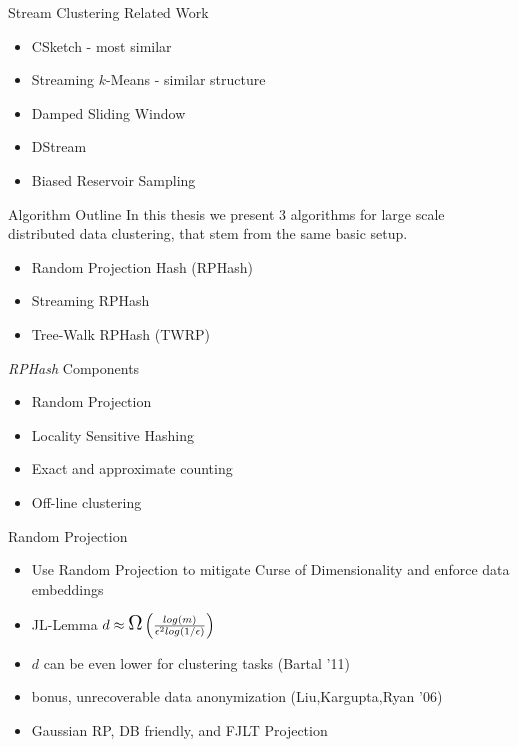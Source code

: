 \documentclass[12pt]{beamer}
\begin{document}
\begin{frame}[plain]{Stream Clustering Related Work}
    \begin{itemize}
      \item CSketch - most similar
      \item Streaming $k$-Means - similar structure
      \item Damped Sliding Window
      \item DStream
      \item Biased Reservoir Sampling
    \end{itemize}
\end{frame}

\begin{frame}[plain]{Algorithm Outline}
In this thesis we present 3 algorithms for large scale distributed data clustering, that
stem from the same basic setup.
 \begin{itemize}
  \item Random Projection Hash (RPHash)
  \item Streaming RPHash
  \item Tree-Walk RPHash (TWRP)
 \end{itemize}
\end{frame}

\begin{frame}[plain]{\emph{RPHash} Components}
\begin{itemize}
   \item Random Projection 
   \item Locality Sensitive Hashing
   \item Exact and approximate counting
   \item Off-line clustering
  \end{itemize}
\end{frame}

\begin{frame}[plain]{Random Projection}
\begin{itemize}
 \item Use Random Projection to mitigate Curse of Dimensionality and enforce data embeddings

\item JL-Lemma
$d \approx \mathlarger{\mathlarger{\mathlarger{\Omega}}} \left( \frac{log(m)}{\epsilon^2 log(1/\epsilon)} \right)   $
  \item $d$ can be even lower for clustering tasks (Bartal '11)
  \item bonus, unrecoverable data anonymization (Liu,Kargupta,Ryan '06)%
  \item Gaussian RP, DB friendly, and FJLT Projection
\end{itemize}
\end{frame}
\end{document}
